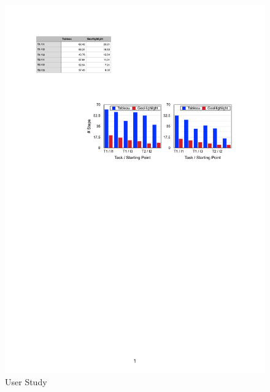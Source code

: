 \begin{figure}[t]
 \centering
 \includegraphics[width=\columnwidth]{figs/userstudy}
\caption{User Study}
\vspace{-5pt}
\label{fig:userstudy}
\end{figure}

